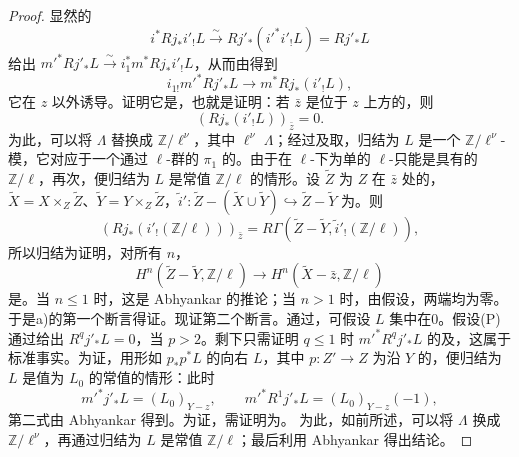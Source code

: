 \begin{proof}
显然的
\[
 i^*Rj_*i'_!L\xrightarrow{\sim}Rj'_*(i'^*i'_!L)=Rj'_*L
\]
给出
$m'^*Rj'_*L\xrightarrow{\sim}i_1^*m^*Rj_*i'_!L$，从而由得到
\[
 i_{1!}m'^*Rj'_*L\longrightarrow m^*Rj_*(i'_!L),
\]
它在 $z$ 以外诱导。证明它是，也就是证明：若 $\bar z$ 是位于 $z$ 上方的，则
\[
 (Rj_*(i'_!L))_{\bar z}=0.
\]
为此，可以将 $\Lambda$ 替换成 $\mathbb Z/\ell^\nu$，其中 $\ell^\nu$  $\Lambda$；经过及取，归结为 $L$ 是一个 $\mathbb Z/\ell^\nu$-模，它对应于一个通过 $\ell$-群的 $\pi_1$ 的。由于在 $\ell$-下为单的 $\ell$-只能是具有的 $\mathbb Z/\ell$，再次，便归结为 $L$ 是常值 $\mathbb Z/\ell$ 的情形。设 $\widetilde Z$ 为 $Z$ 在 $\bar z$ 处的，$\widetilde X=X\times_Z\widetilde Z$、$\widetilde Y=Y\times_Z\widetilde Z$，$\widetilde i':\widetilde Z-(\widetilde X\cup\widetilde Y)\hookrightarrow\widetilde Z-\widetilde Y$ 为。则
\[
 (Rj_*(i'_!(\mathbb Z/\ell)))_{\bar z}
 =R\Gamma(\widetilde Z-\widetilde Y,\widetilde i'_!(\mathbb Z/\ell)),
\]
所以归结为证明，对所有 $n$，
\[
 H^n(\widetilde Z-\widetilde Y,\mathbb Z/\ell)\longrightarrow
 H^n(\widetilde X-\bar z,\mathbb Z/\ell)
\]
是。当 $n\leq1$ 时，这是 Abhyankar 的推论；当 $n>1$ 时，由假设，两端均为零。于是a)的第一个断言得证。现证第二个断言。通过，可假设 $L$ 集中在0。假设(P)通过给出 $R^qj'_*L=0$，当 $p>2$。剩下只需证明 $q\leq1$ 时 $m'^*R^qj'_*L$ 的及，这属于标准事实。为证，用形如 $p_*p^*L$ 的向右 $L$，其中 $p:Z'\to Z$ 为沿 $Y$ 的，便归结为 $L$ 是值为 $L_0$ 的常值的情形：此时
\[
 m'^*j'_*L=(L_0)_{Y-z},\qquad
 m'^*R^1j'_*L=(L_0)_{Y-z}(-1),
\]
第二式由 Abhyankar 得到。为证，需证明为。
为此，如前所述，可以将 $\Lambda$ 换成 $\mathbb Z/\ell^\nu$，再通过归结为 $L$ 是常值 $\mathbb Z/\ell$；最后利用 Abhyankar 得出结论。


\end{proof}
